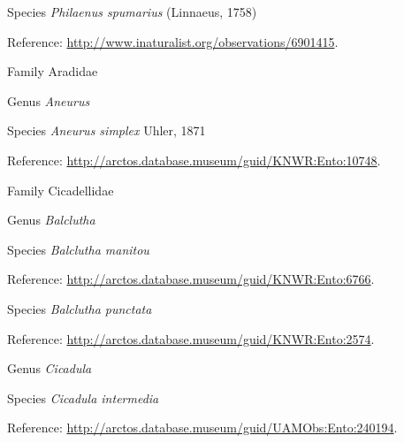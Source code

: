 \documentclass[9pt, article]{memoir}
\begin{document}
\begin{multicols}{2}
\vspace{6pt}\noindent\hspace{36pt}Species \textit{Philaenus spumarius} (Linnaeus, 1758)


\vspace{6pt}Reference: 
\url{http://www.inaturalist.org/observations/6901415}.

\vspace{6pt}\noindent\hspace{24pt}Family Aradidae


\vspace{6pt}\noindent\hspace{30pt}Genus \textit{Aneurus}


\vspace{6pt}\noindent\hspace{36pt}Species \textit{Aneurus simplex} Uhler, 1871


\vspace{6pt}Reference: 
\url{http://arctos.database.museum/guid/KNWR:Ento:10748}.

\vspace{6pt}\noindent\hspace{24pt}Family Cicadellidae


\vspace{6pt}\noindent\hspace{30pt}Genus \textit{Balclutha}


\vspace{6pt}\noindent\hspace{36pt}Species \textit{Balclutha manitou}


\vspace{6pt}Reference: 
\url{http://arctos.database.museum/guid/KNWR:Ento:6766}.

\vspace{6pt}\noindent\hspace{36pt}Species \textit{Balclutha punctata}


\vspace{6pt}Reference: 
\url{http://arctos.database.museum/guid/KNWR:Ento:2574}.

\vspace{6pt}\noindent\hspace{30pt}Genus \textit{Cicadula}


\vspace{6pt}\noindent\hspace{36pt}Species \textit{Cicadula intermedia}


\vspace{6pt}Reference: 
\url{http://arctos.database.museum/guid/UAMObs:Ento:240194}.


\end{multicols}
\end{document}
